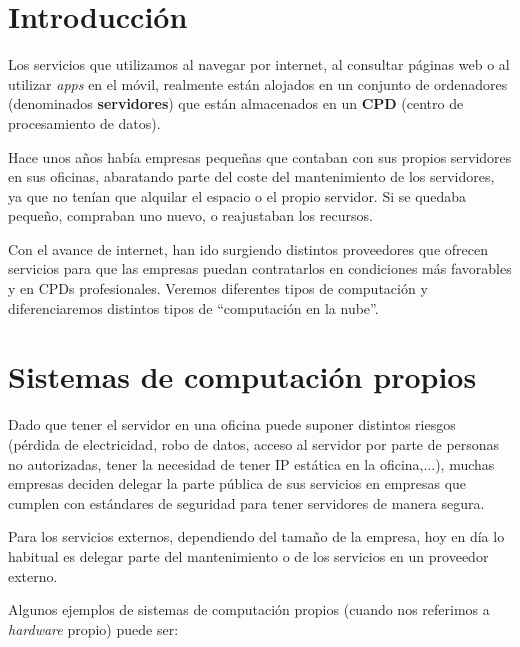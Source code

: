 \chapter{Introducción}

Los servicios que utilizamos al navegar por internet, al consultar páginas web o al utilizar \textit{apps} en el móvil, realmente están alojados en un conjunto de ordenadores (denominados \textbf{servidores}) que están almacenados en un \textbf{CPD} (centro de procesamiento de datos).

Hace unos años había empresas pequeñas que contaban con sus propios servidores en sus oficinas, abaratando parte del coste del mantenimiento de los servidores, ya que no tenían que alquilar el espacio o el propio servidor. Si se quedaba pequeño, compraban uno nuevo, o reajustaban los recursos.

Con el avance de internet, han ido surgiendo distintos proveedores que ofrecen servicios para que las empresas puedan contratarlos en condiciones más favorables y en CPDs profesionales. Veremos diferentes tipos de computación y diferenciaremos distintos tipos de “computación en la nube”.



\chapter{Sistemas de computación propios}
Dado que tener el servidor en una oficina puede suponer distintos riesgos (pérdida de electricidad, robo de datos, acceso al servidor por parte de personas no autorizadas, tener la necesidad de tener IP estática en la oficina,...), muchas empresas deciden delegar la parte pública de sus servicios en empresas que cumplen con estándares de seguridad para tener servidores de manera segura.


Para los servicios externos, dependiendo del tamaño de la empresa, hoy en día lo habitual es delegar parte del mantenimiento o de los servicios en un proveedor externo.

Algunos ejemplos de sistemas de computación propios (cuando nos referimos a \textit{hardware} propio) puede ser:


